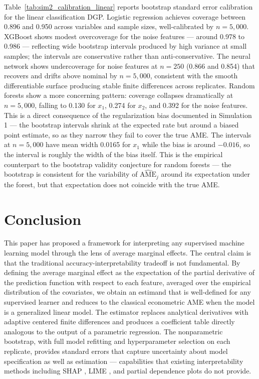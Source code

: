 \documentclass[conference]{IEEEtran}
\begin{document}
	Table~\ref{tab:sim2_calibration_linear} reports bootstrap standard error calibration for the linear classification DGP. Logistic regression achieves coverage between 0.896 and 0.950 across variables and sample sizes, well-calibrated by $n=5{,}000$. XGBoost shows modest overcoverage for the noise features --- around 0.978 to 0.986 --- reflecting wide bootstrap intervals produced by high variance at small samples; the intervals are conservative rather than anti-conservative. The neural network shows undercoverage for noise features at $n=250$ (0.866 and 0.854) that recovers and drifts above nominal by $n=5{,}000$, consistent with the smooth differentiable surface producing stable finite differences across replicates. Random forests show a more concerning pattern: coverage collapses dramatically at $n=5{,}000$, falling to 0.130 for $x_1$, 0.274 for $x_2$, and 0.392 for the noise features. This is a direct consequence of the regularization bias documented in Simulation 1 --- the bootstrap intervals shrink at the expected rate but around a biased point estimate, so as they narrow they fail to cover the true AME. The intervals at $n=5{,}000$ have mean width 0.0165 for $x_1$ while the bias is around $-0.016$, so the interval is roughly the width of the bias itself. This is the empirical counterpart to the bootstrap validity conjecture for random forests --- the bootstrap is consistent for the variability of $\widehat{\mathrm{AME}}_j$ around its expectation under the forest, but that expectation does not coincide with the true AME.
	
	\section{Conclusion}
	
	This paper has proposed a framework for interpreting any supervised machine learning model through the lens of average marginal effects. The central claim is that the traditional accuracy-interpretability tradeoff is not fundamental. By defining the average marginal effect as the expectation of the partial derivative of the prediction function with respect to each feature, averaged over the empirical distribution of the covariates, we obtain an estimand that is well-defined for any supervised learner and reduces to the classical econometric AME when the model is a generalized linear model. The estimator replaces analytical derivatives with adaptive centered finite differences and produces a coefficient table directly analogous to the output of a parametric regression. The nonparametric bootstrap, with full model refitting and hyperparameter selection on each replicate, provides standard errors that capture uncertainty about model specification as well as estimation --- capabilities that existing interpretability methods including SHAP \cite{lundberg2017shap}, LIME \cite{ribeiro2016lime}, and partial dependence plots \cite{friedman2001pdp} do not provide.
	
\end{document}
